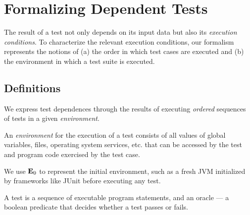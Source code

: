 
\section{Formalizing Dependent Tests}
\label{sec:formalism}


The result of a test not only depends on
its input data but also its \emph{execution conditions}.
To characterize the relevant execution conditions, 
our formalism represents the notions of
(a) the order in which test cases are executed and (b) the environment in which a test suite is executed.  


\subsection{Definitions}
\label{sec:definitions}

We express test dependences through the results of executing
\emph{ordered} sequences of tests in a given \emph{environment}.


\begin{definition}[Environment]
An \emph{environment} \env for the execution of a test
consists of all values of global variables, files,
operating
system services, etc. that
can be accessed by the test and program code exercised by the test
case.
\end{definition}

We use $\mathbf{E}_0$ to represent the initial environment, such
as a fresh JVM initialized by frameworks like JUnit
before executing any test.


\begin{definition}[Test]

A test is a sequence of executable program statements, and an oracle
--- a boolean predicate that
decides whether a test passes or fails.
\end{definition}



